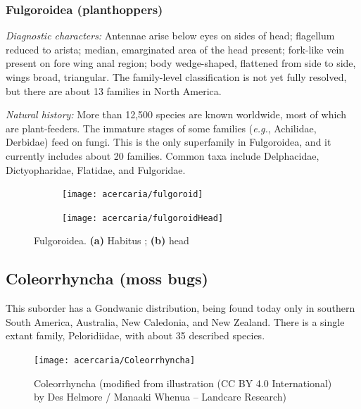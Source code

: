 \subsubsection{Fulgoroidea (planthoppers)}
\noindent{}\textit{Diagnostic characters:} Antennae arise below eyes on sides of head; flagellum reduced to arista; median, emarginated area of the head present; fork-like vein present on fore wing anal region; body wedge-shaped, flattened from side to side, wings broad, triangular. The family-level classification is not yet fully resolved, but there are about 13 families in North America.\vspace{3mm}

\noindent{}\textit{Natural history:} More than 12,500 species are known worldwide, most of which are plant-feeders. The immature stages of some families (\textit{e.g.}, Achilidae, Derbidae) feed on fungi. This is the only superfamily in Fulgoroidea, and it currently includes about 20 families. Common taxa include Delphacidae, Dictyopharidae, Flatidae, and Fulgoridae.\vspace{3mm}

\begin{figure}[ht!]
 \centering
 \begin{subfigure}[ht!]{0.5\textwidth}
  \texttt{[image: acercaria/fulgoroid]}
  \caption{}
  \label{fig:fulgoroid}
 \end{subfigure}
 \hfill
 \begin{subfigure}[ht!]{0.4\textwidth}
  \texttt{[image: acercaria/fulgoroidHead]}
  \caption{}
  \label{fig:fulgoroidHead}
 \end{subfigure}
 \caption{Fulgoroidea. \textbf{(a)} Habitus \citep[Modified from][Fig. 1]{britton1923hemiptera}; \textbf{(b)} head \citep[Modified from][Fig. 2]{britton1923hemiptera}}\label{fig:fulgoroidea}
\end{figure}

\subsection{Coleorrhyncha (moss bugs)}
This suborder has a Gondwanic distribution, being found today only in southern South America, Australia, New Caledonia, and New Zealand. There is a single extant family, Peloridiidae, with about 35 described species.

\begin{figure}[ht!]
 \centering
 \texttt{[image: acercaria/Coleorrhyncha]}
 \caption{Coleorrhyncha (modified from illustration (CC BY 4.0 International) by Des Helmore / Manaaki Whenua – Landcare Research)}
 \label{fig:coleorrhyncha}
\end{figure}

